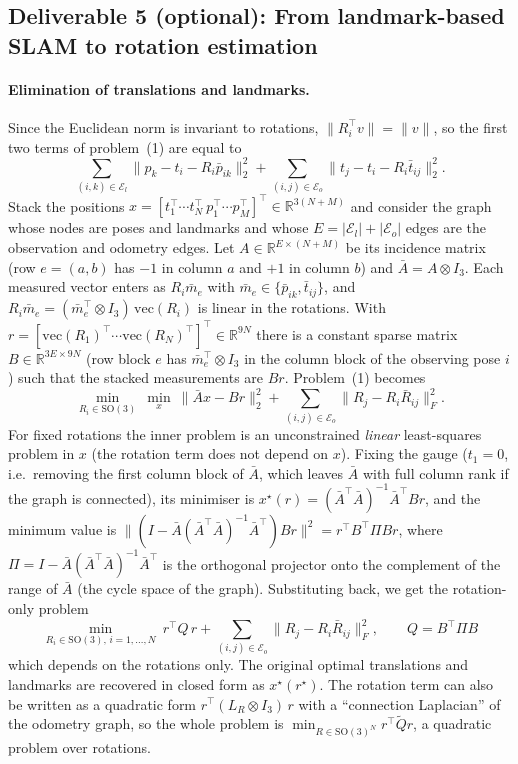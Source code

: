 \subsection{Deliverable 5 (optional): From landmark-based SLAM to rotation estimation}\label{sec:d5}

\paragraph{Elimination of translations and landmarks.}
Since the Euclidean norm is invariant to rotations, $\|R_i^\top v\|=\|v\|$, so the first two
terms of problem~(1) are equal to
\begin{equation}
\sum_{(i,k)\in\mathcal{E}_l}\|p_k-t_i-R_i\bar p_{ik}\|_2^2
+\sum_{(i,j)\in\mathcal{E}_o}\|t_j-t_i-R_i\bar t_{ij}\|_2^2 .
\end{equation}
Stack the positions $x=[t_1^\top\cdots t_N^\top\ p_1^\top\cdots p_M^\top]^\top\in\mathbb{R}^{3(N+M)}$
and consider the graph whose nodes are poses and landmarks and whose $E=|\mathcal{E}_l|+|\mathcal{E}_o|$
edges are the observation and odometry edges. Let $A\in\mathbb{R}^{E\times(N+M)}$ be its
incidence matrix (row $e=(a,b)$ has $-1$ in column $a$ and $+1$ in column $b$) and
$\bar A=A\otimes I_3$. Each measured vector enters as $R_i\bar m_e$ with $\bar m_e\in\{\bar p_{ik},\bar t_{ij}\}$,
and $R_i\bar m_e=(\bar m_e^\top\otimes I_3)\,\mathrm{vec}(R_i)$ is linear in the rotations.
With $r=[\mathrm{vec}(R_1)^\top\cdots\mathrm{vec}(R_N)^\top]^\top\in\mathbb{R}^{9N}$ there is a
constant sparse matrix $B\in\mathbb{R}^{3E\times 9N}$ (row block $e$ has
$\bar m_e^\top\otimes I_3$ in the column block of the observing pose $i$) such that the
stacked measurements are $Br$. Problem~(1) becomes
\begin{equation}
\min_{R_i\in\mathrm{SO}(3)}\ \min_{x}\ \|\bar A x - Br\|_2^2 + \sum_{(i,j)\in\mathcal{E}_o}\|R_j-R_i\bar R_{ij}\|_F^2 .
\end{equation}
For fixed rotations the inner problem is an unconstrained \emph{linear} least-squares
problem in $x$ (the rotation term does not depend on $x$). Fixing the gauge ($t_1=0$, i.e.\
removing the first column block of $\bar A$, which leaves $\bar A$ with full column rank if
the graph is connected), its minimiser is
$x^\star(r)=(\bar A^\top\bar A)^{-1}\bar A^\top B r$, and the minimum value is
$\|(I-\bar A(\bar A^\top\bar A)^{-1}\bar A^\top)Br\|^2=r^\top B^\top \Pi B r$, where
$\Pi=I-\bar A(\bar A^\top\bar A)^{-1}\bar A^\top$ is the orthogonal projector onto the
complement of the range of $\bar A$ (the cycle space of the graph). Substituting back, we get
the rotation-only problem
\begin{equation}
\min_{R_i\in\mathrm{SO}(3),\,i=1,\ldots,N}\ r^\top Q\, r+\sum_{(i,j)\in\mathcal{E}_o}\|R_j-R_i\bar R_{ij}\|_F^2,\qquad Q=B^\top\Pi B
\end{equation}
which depends on the rotations only. The original optimal translations and landmarks are
recovered in closed form as $x^\star(r^\star)$. The rotation term can also be written as a
quadratic form $r^\top (L_R\otimes I_3)\,r$ with a ``connection Laplacian'' of the odometry
graph, so the whole problem is $\min_{R\in\mathrm{SO}(3)^N} r^\top \tilde Q r$, a quadratic
problem over rotations.

